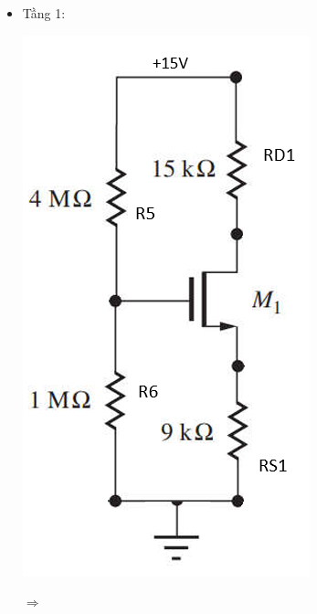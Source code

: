 \begin{itemize}[label=-]

	\item Tầng 1:
	
	\begin{minipage}{0.4\linewidth}
		\includegraphics[width=.7\linewidth]{./my-chapters/my-images/Question6/DC_tang1.png}
	\end{minipage}
	\begin{minipage}{0.1\linewidth}
		$\Rightarrow$
	\end{minipage}
	\begin{minipage}{0.4\linewidth}

\end{minipage}
\end{itemize}
